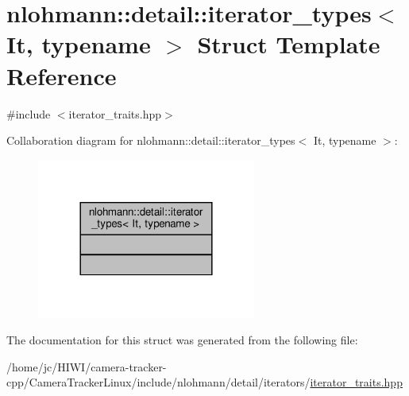 \hypertarget{structnlohmann_1_1detail_1_1iterator__types}{}\section{nlohmann\+:\+:detail\+:\+:iterator\+\_\+types$<$ It, typename $>$ Struct Template Reference}
\label{structnlohmann_1_1detail_1_1iterator__types}


{\ttfamily \#include $<$iterator\+\_\+traits.\+hpp$>$}



Collaboration diagram for nlohmann\+:\+:detail\+:\+:iterator\+\_\+types$<$ It, typename $>$\+:\nopagebreak
\begin{figure}[H]
\begin{center}
\leavevmode
\includegraphics[width=204pt]{structnlohmann_1_1detail_1_1iterator__types__coll__graph}
\end{center}
\end{figure}


The documentation for this struct was generated from the following file\+:\begin{DoxyCompactItemize}
\item 
/home/jc/\+H\+I\+W\+I/camera-\/tracker-\/cpp/\+Camera\+Tracker\+Linux/include/nlohmann/detail/iterators/\hyperlink{iterator__traits_8hpp}{iterator\+\_\+traits.\+hpp}\end{DoxyCompactItemize}
